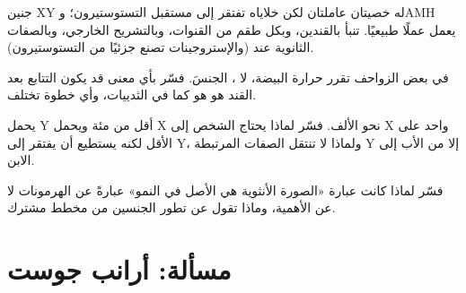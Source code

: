 \begin{exercise}[$\star\star\star$]\label{exo:g11:becoming-male-female:12}
جنين XY له خصيتان عاملتان لكن خلاياه تفتقر إلى مستقبل التستوستيرون؛
وAMH يعمل عملًا طبيعيًا. تنبأ بالقندين، وبكل طقم من القنوات، وبالتشريح
الخارجي، وبالصفات الثانوية عند  (والإستروجينات تصنع جزئيًا من
التستوستيرون).
\end{exercise}

\begin{exercise}[$\star\star\star$]\label{exo:g11:becoming-male-female:13}
في بعض الزواحف تقرر حرارة البيضة، لا ، الجنسَ. فسّر بأي معنى قد
يكون التتابع بعد القند هو هو كما في الثدييات، وأي خطوة تختلف.
\end{exercise}

\begin{exercise}[$\star\star\star$]\label{exo:g11:becoming-male-female:14}
يحمل  Y أقل من مئة  ويحمل X نحو الألف. فسّر لماذا يحتاج
الشخص إلى  X واحد على الأقل لكنه يستطيع أن يفتقر إلى Y، ولماذا لا
تنتقل الصفات المرتبطة  Y إلا من الأب إلى الابن.
\end{exercise}

\begin{exercise}[$\star\star\star$]\label{exo:g11:becoming-male-female:15}
فسّر لماذا كانت عبارة «الصورة الأنثوية هي الأصل في النمو» عبارةً عن
الهرمونات لا عن الأهمية، وماذا تقول عن تطور الجنسين من مخطط مشترك.
\end{exercise}

\section{مسألة: أرانب جوست}

